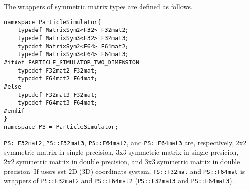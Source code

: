 The wrappers of symmetric matrix types are defined as follows.
\begin{lstlisting}[caption=matrixsymwrapper]
namespace ParticleSimulator{
    typedef MatrixSym2<F32> F32mat2;
    typedef MatrixSym3<F32> F32mat3;
    typedef MatrixSym2<F64> F64mat2;
    typedef MatrixSym3<F64> F64mat3;
#ifdef PARTICLE_SIMULATOR_TWO_DIMENSION
    typedef F32mat2 F32mat;
    typedef F64mat2 F64mat;
#else
    typedef F32mat3 F32mat;
    typedef F64mat3 F64mat;
#endif
}
namespace PS = ParticleSimulator;
\end{lstlisting}

\texttt{PS::F32mat2}, \texttt{PS::F32mat3}, \texttt{PS::F64mat2}, and \texttt{PS::F64mat3} are,
respectively, 2x2 symmetric matrix in single precision, 3x3 symmetric
matrix in single presicion, 2x2 symmetric matrix in double precision,
and 3x3 symmetric matrix in double precision. If users set 2D (3D)
coordinate system, \texttt{PS::F32mat} and \texttt{PS::F64mat} is wrappers of
\texttt{PS::F32mat2} and \texttt{PS::F64mat2} (\texttt{PS::F32mat3} and \texttt{PS::F64mat3}).

